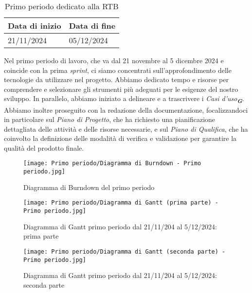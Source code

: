 \begin{table}[h!]
    \centering
    \renewcommand{\arraystretch}{1.5} %
    \begin{tabularx}{\textwidth}{|X|X|}\hline
    \rowcolor[HTML]{FFD700} 
    \textbf{Data di inizio} & \textbf{Data di fine} \\ \hline
    21/11/2024 & 05/12/2024 \\ \hline
    \end{tabularx}
    \caption{Primo periodo dedicato alla RTB}
\end{table}
Nel primo periodo di lavoro, che va dal 21 novembre al 5 dicembre 2024 e coincide con la prima \textit{sprint}, 
ci siamo concentrati sull'approfondimento delle tecnologie da utilizzare nel progetto. 
Abbiamo dedicato tempo e risorse per comprendere e selezionare gli strumenti più adeguati per le esigenze del nostro sviluppo. In parallelo, abbiamo iniziato a delineare e a trascrivere i \textit{Casi d'uso}\textsubscript{\textit{\textbf{G}}}.
Abbiamo inoltre proseguito con la redazione della documentazione, focalizzandoci in particolare sul \textit{Piano di Progetto}, che ha richiesto una pianificazione dettagliata delle attività e delle risorse necessarie, e sul \textit{Piano di Qualifica}, che ha coinvolto la definizione delle modalità di verifica e validazione per garantire la qualità del prodotto finale.
\newpage
\begin{figure}[h] 
    \centering
    \texttt{[image: Primo periodo/Diagramma di Burndown - Primo periodo.jpg]}
    \caption{Diagramma di Burndown del primo periodo} 
    \label{fig: Diagramma di Burndown del primo periodo}
\end{figure}
\newpage
\begin{figure}[h] 
    \centering
    \texttt{[image: Primo periodo/Diagramma di Gantt (prima parte) - Primo periodo.jpg]}
    \caption{Diagramma di Gantt primo periodo dal 21/11/204 al 5/12/2024: prima parte} 
    \label{fig: Diagramma di Gantt primo periodo dal 21/11/204 al 5/12/2024: prima parte}
\end{figure}
\newpage


\begin{figure}[h] 
    \centering
    \texttt{[image: Primo periodo/Diagramma di Gantt (seconda parte) - Primo periodo.jpg]}
    \caption{Diagramma di Gantt primo periodo dal 21/11/204 al 5/12/2024: seconda parte} 
    \label{fig: Diagramma di Gantt primo periodo dal 21/11/204 al 5/12/2024: seconda parte}
\end{figure}

